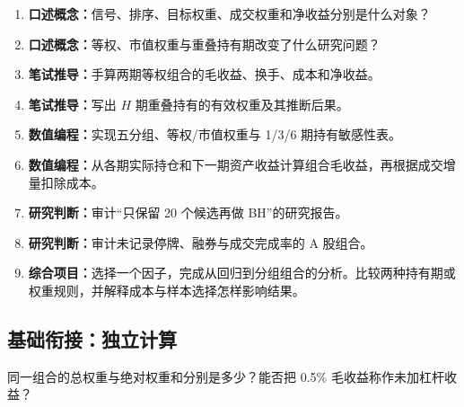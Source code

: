 \begin{enumerate}[leftmargin=*]
  \item \textbf{口述概念：}信号、排序、目标权重、成交权重和净收益分别是什么对象？
  \item \textbf{口述概念：}等权、市值权重与重叠持有期改变了什么研究问题？
  \item \textbf{笔试推导：}手算两期等权组合的毛收益、换手、成本和净收益。
  \item \textbf{笔试推导：}写出 $H$ 期重叠持有的有效权重及其推断后果。
  \item \textbf{数值编程：}实现五分组、等权/市值权重与 1/3/6 期持有敏感性表。
  \item \textbf{数值编程：}从各期实际持仓和下一期资产收益计算组合毛收益，再根据成交增量扣除成本。
  \item \textbf{研究判断：}审计“只保留 20 个候选再做 BH”的研究报告。
  \item \textbf{研究判断：}审计未记录停牌、融券与成交完成率的 A 股组合。
  \item \textbf{综合项目：}选择一个因子，完成从回归到分组组合的分析。比较两种持有期或权重规则，并解释成本与样本选择怎样影响结果。
\end{enumerate}

\subsection*{基础衔接：独立计算}
同一组合的总权重与绝对权重和分别是多少？能否把 0.5\% 毛收益称作未加杠杆收益？
